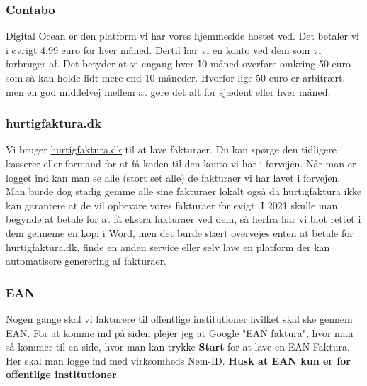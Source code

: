 \subsubsection{Contabo}
Digital Ocean er den platform vi har vores hjemmeside hostet ved. Det betaler vi i øvrigt 4.99 euro for hver måned. Dertil har vi en konto ved dem som vi forbruger af. Det betyder at vi engang hver \~10 måned overføre omkring 50 euro som så kan holde lidt mere end 10 måneder. Hvorfor lige 50 euro er arbitrært, men en god middelvej mellem at gøre det alt for sjædent eller hver måned.
\subsubsection{hurtigfaktura.dk}
Vi bruger \href{https://www.hurtigfaktura.dk/}{hurtigfaktura.dk} til at lave fakturaer. Du kan spørge den tidligere kasserer eller formand for at få koden til den konto vi har i forvejen. Når man er logget ind kan man se alle (stort set alle) de fakturaer vi har lavet i forvejen. Man burde dog stadig gemme alle sine fakturaer lokalt også da hurtigfaktura ikke kan garantere at de vil opbevare vores fakturaer for evigt. I 2021 skulle man begynde at betale for at få ekstra fakturaer ved dem, så herfra har vi blot rettet i dem genneme en kopi i Word, men det burde stært overvejes enten at betale for hurtigfaktura.dk, finde en anden service eller selv lave en platform der kan automatisere generering af fakturaer.
\subsubsection{EAN}
Nogen gange skal vi fakturere til offentlige institutioner hvilket skal ske gennem EAN. For at komme ind på siden plejer jeg at Google "EAN faktura", hvor man så kommer til en side, hvor man kan trykke \textbf{Start} for at lave en EAN Faktura. Her skal man logge ind med virksomheds Nem-ID. \textbf{Husk at EAN kun er for offentlige institutioner}

